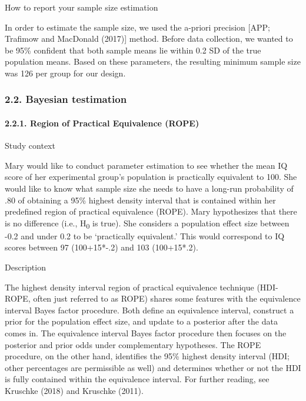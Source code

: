 \documentclass[
  english,
  man,floatsintext]{apa6}
\let\oldparagraph\paragraph
\renewcommand{\paragraph}[1]{\oldparagraph{#1}\mbox{}}
\begin{document}
How to report your sample size estimation

In order to estimate the sample size, we used the a-priori precision {[}APP; Trafimow and MacDonald (2017){]} method. Before data collection, we wanted to be 95\% confident that both sample means lie within 0.2 SD of the true population means. Based on these parameters, the resulting minimum sample size was 126 per group for our design.

\hypertarget{bayesian-testimation}{%
\subsubsection{2.2. Bayesian testimation}\label{bayesian-testimation}}

\hypertarget{region-of-practical-equivalence-rope}{%
\paragraph{2.2.1. Region of Practical Equivalence (ROPE)}\label{region-of-practical-equivalence-rope}}

Study context

Mary would like to conduct parameter estimation to see whether the mean IQ score of her experimental group's population is practically equivalent to 100. She would like to know what sample size she needs to have a long-run probability of .80 of obtaining a 95\% highest density interval that is contained within her predefined region of practical equivalence (ROPE). Mary hypothesizes that there is no difference (i.e., H\textsubscript{0} is true). She considers a population effect size between -0.2 and under 0.2 to be `practically equivalent.' This would correspond to IQ scores between 97 (100+15*-.2) and 103 (100+15*.2).

Description

The highest density interval region of practical equivalence technique (HDI-ROPE, often just referred to as ROPE) shares some features with the equivalence interval Bayes factor procedure. Both define an equivalence interval, construct a prior for the population effect size, and update to a posterior after the data comes in. The equivalence interval Bayes factor procedure then focuses on the posterior and prior odds under complementary hypotheses. The ROPE procedure, on the other hand, identifies the 95\% highest density interval (HDI; other percentages are permissible as well) and determines whether or not the HDI is fully contained within the equivalence interval. For further reading, see Kruschke (2018) and Kruschke (2011).
\end{document}
